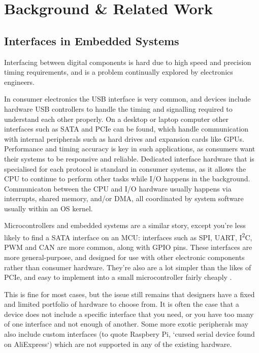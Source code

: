\chapter{Background \& Related Work}
\label{ch:background}

\section{Interfaces in Embedded Systems}

Interfacing between digital components is hard due to high speed and precision timing requirements, and is a problem continually explored by electronics engineers.

In consumer electronics the USB interface is very common, and devices include hardware USB controllers to handle the timing and signalling required to understand each other properly. On a desktop or laptop computer other interfaces such as SATA and PCIe can be found, which handle communication with internal peripherals such as hard drives and expansion cards like GPUs. Performance and timing accuracy is key in such applications, as consumers want their systems to be responsive and reliable. Dedicated interface hardware that is specialised for each protocol is standard in consumer systems, as it allows the CPU to continue to perform other tasks while I/O happens in the background. Communicaton between the CPU and I/O hardware usually happens via interrupts, shared memory, and/or DMA, all coordinated by system software usually within an OS kernel.

Microcontrollers and embedded systems are a similar story, except you're less likely to find a SATA interface on an MCU: interfaces such as SPI, UART, I\textsuperscript{2}C, PWM and CAN are more common, along with GPIO pins. These interfaces are more general-purpose, and designed for use with other electronic components rather than consumer hardware. They're also are a lot simpler than the likes of PCIe, and easy to implement into a small microcontroller fairly cheaply \cite{rp2040}.

This is fine for most cases, but the issue still remains that designers have a fixed and limited portfolio of hardware to choose from. It is often the case that a device does not include a specific interface that you need, or you have too many of one interface and not enough of another. Some more exotic peripherals may also include custom interfaces (to quote Raspbery Pi, `cursed serial device found on AliExpress`) which are not supported in any of the existing hardware.

